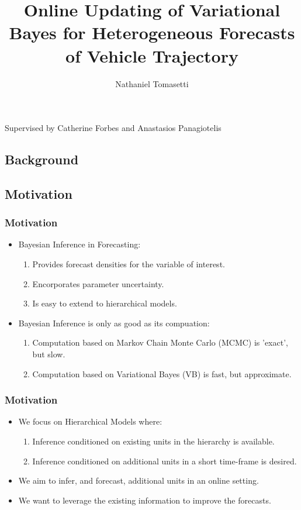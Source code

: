 \documentclass[11pt]{beamer}\usepackage[]{graphicx}\usepackage[]{color}
\title[Online Updating of Variational Bayes]{Online Updating of Variational Bayes for Heterogeneous Forecasts of Vehicle Trajectory}
\author[Nathaniel Tomasetti]{Nathaniel Tomasetti}
\date{ }
\begin{document}
\begin{frame}
\titlepage
\centering
Supervised by Catherine Forbes and Anastasios Panagiotelis
\end{frame}


\begin{frame}
\tableofcontents
\end{frame}

\begin{frame}
\section{Background}
\subsection{Motivation}
\frametitle{Motivation}
\begin{itemize}
\item Bayesian Inference in Forecasting:
\begin{enumerate}
\item Provides forecast densities for the variable of interest.
\item Encorporates parameter uncertainty.
\item Is easy to extend to hierarchical models.
\end{enumerate}
\vspace{3mm}
\item Bayesian Inference is only as good as its compuation:
\begin{enumerate}
\item Computation based on Markov Chain Monte Carlo (MCMC) is 'exact', but slow.
\item Computation based on Variational Bayes (VB) is fast, but approximate.
\end{enumerate}
\end{itemize}
\end{frame}

\begin{frame}
\frametitle{Motivation}
\begin{itemize}
\item We focus on Hierarchical Models where:
\begin{enumerate}
\item Inference conditioned on existing units in the hierarchy is available.
\item Inference conditioned on additional units in a short time-frame is desired.
\end{enumerate}
\vspace{3mm}
\item We aim to infer, and forecast, additional units in an online setting.
\item We want to leverage the existing information to improve the forecasts.
\end{itemize}
\end{frame}
\end{document}
